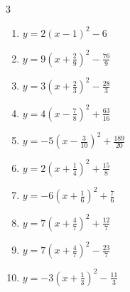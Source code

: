 \begin{multicols}{3}
\begin{enumerate}
  \item $\displaystyle y=2\left( x-1\right)^{2}-6$

        \phantom{$\displaystyle 頂点\left( 1 , -6 \right)$}

  \item $\displaystyle y=9\left( x+\frac{2}{9}\right)^{2}-\frac{76}{9}$


  \item $\displaystyle y=3\left( x+\frac{2}{3}\right)^{2}-\frac{28}{3}$


  \item $\displaystyle y=4\left( x-\frac{7}{8}\right)^{2}+\frac{63}{16}$


  \item $\displaystyle y=-5\left( x-\frac{3}{10}\right)^{2}+\frac{189}{20}$


  \item $\displaystyle y=2\left( x+\frac{1}{4}\right)^{2}+\frac{15}{8}$


\columnbreak %

\resetques

  \item $\displaystyle y=-6\left( x+\frac{1}{6}\right)^{2}+\frac{7}{6}$


  \item $\displaystyle y=7\left( x+\frac{4}{7}\right)^{2}+\frac{12}{7}$


  \item $\displaystyle y=7\left( x+\frac{4}{7}\right)^{2}-\frac{23}{7}$


  \item $\displaystyle y=-3\left( x+\frac{1}{3}\right)^{2}-\frac{11}{3}$


\end{enumerate}
\end{multicols}
